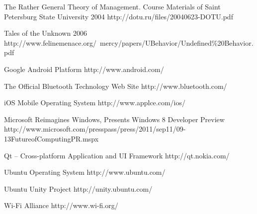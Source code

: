 \begin{thebibliography}{9}
		{The Rather General Theory of Management. Course Materials of Saint Petersburg State
			University}
		{2004}
		{http://dotu.ru/files/20040623-DOTU.pdf}

		{Tales of the Unknown}
		{2006}
		{http://www.felinemenace.org/~mercy/papers/UBehavior/Undefined\%20Behavior.pdf}
	

		{Google Android Platform}
		{http://www.android.com/}
	
		{The Official Bluetooth Technology Web Site}
		{http://www.bluetooth.com/}
	
		{iOS Mobile Operating System}
		{http://www.applce.com/ios/}

		{Microsoft Reimagines Windows, Presents Windows 8 Developer Preview}
		{http://www.microsoft.com/presspass/press/2011/sep11/09-13FutureofComputingPR.mspx}
		
		{Qt -- Cross-platform Application and UI Framework}
		{http://qt.nokia.com/}
	
		{Ubuntu Operating System}
		{http://www.ubuntu.com/}
		
		{Ubuntu Unity Project}
		{http://unity.ubuntu.com/}

		{Wi-Fi Alliance}
		{http://www.wi-fi.org/}

\end{thebibliography}